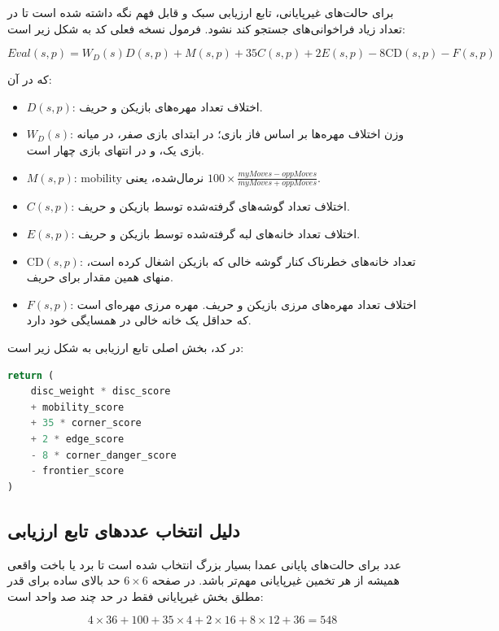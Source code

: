 \documentclass[10.5pt]{exam}
\begin{document}
برای حالت‌های غیرپایانی، تابع ارزیابی سبک و قابل فهم نگه داشته شده است تا در تعداد زیاد فراخوانی‌های جستجو کند نشود. فرمول نسخه فعلی کد به شکل زیر است:

\[
    Eval(s,p)=W_D(s)D(s,p)+M(s,p)+35C(s,p)+2E(s,p)-8\mathrm{CD}(s,p)-F(s,p)
\]

که در آن:

\begin{itemize}
    \item \(D(s,p)\): اختلاف تعداد مهره‌های بازیکن و حریف.
    \item \(W_D(s)\): وزن اختلاف مهره‌ها بر اساس فاز بازی؛ در ابتدای بازی صفر، در میانه بازی یک، و در انتهای بازی چهار است.
    \item \(M(s,p)\): mobility نرمال‌شده، یعنی
    \(100 \times \frac{myMoves-oppMoves}{myMoves+oppMoves}\).
    \item \(C(s,p)\): اختلاف تعداد گوشه‌های گرفته‌شده توسط بازیکن و حریف.
    \item \(E(s,p)\): اختلاف تعداد خانه‌های لبه گرفته‌شده توسط بازیکن و حریف.
    \item \(\mathrm{CD}(s,p)\): تعداد خانه‌های خطرناک کنار گوشه خالی که بازیکن اشغال کرده است، منهای همین مقدار برای حریف.
    \item \(F(s,p)\): اختلاف تعداد مهره‌های مرزی
    بازیکن و حریف. مهره مرزی مهره‌ای است که حداقل یک خانه خالی در همسایگی خود دارد.
\end{itemize}

در کد، بخش اصلی تابع ارزیابی به شکل زیر است:

\begin{latin}
\begin{lstlisting}[language=Python]
return (
    disc_weight * disc_score
    + mobility_score
    + 35 * corner_score
    + 2 * edge_score
    - 8 * corner_danger_score
    - frontier_score
)
\end{lstlisting}
\end{latin}

\subsection{دلیل انتخاب عددهای تابع ارزیابی}
عدد
برای حالت‌های پایانی عمدا بسیار بزرگ انتخاب شده است تا برد یا باخت واقعی همیشه از هر تخمین غیرپایانی مهم‌تر باشد. در صفحه
\(6\times6\)
حد بالای ساده برای قدر مطلق بخش غیرپایانی فقط در حد چند صد واحد است:

\[
    4\times36 + 100 + 35\times4 + 2\times16 + 8\times12 + 36 = 548
\]
\end{document}
